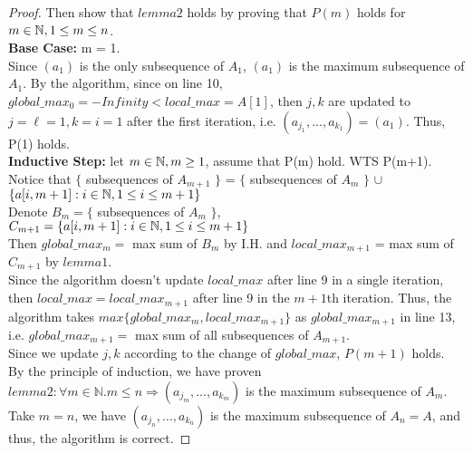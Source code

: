 \documentclass[11pt]{article}
\begin{document}
\begin{enumerate}
\begin{proof}
    Then show that $lemma2$ holds by proving that $P(m)$ holds for $m \in \mathbb N, 1\leq m \leq n$.\\[2ex]
    \textbf{Base Case:} m = 1.\\
    Since $(a_1)$ is the only subsequence of $A_1$, $(a_1)$ is the maximum subsequence of $A_1$. By the algorithm, since on line 10, $global\_max_0 = -Infinity < local\_max = A[1]$, then $j, k$ are updated to $j=\ell = 1, k= i = 1$ after the first iteration, i.e. $(a_{j_1},...,a_{k_1}) = (a_1)$. Thus, P(1) holds.\\[2ex]
    \textbf{Inductive Step: } let $m\in \mathbb N, m \geq 1$, assume that P(m) hold. WTS P(m+1).\\
    Notice that $\{$ subsequences of $A_{m+1}$ $\} $ = $\{$ subsequences of $A_{m}$ $\} $ $\cup$ $\{a[i, m+1]:  i\in\mathbb N, 1\leq i \leq m+1\} $\\
    Denote $B_m = \{$ subsequences of $A_{m}$ $\}$, $C_{m+1} = \{a[i, m+1]:  i\in\mathbb N, 1\leq i \leq m+1\} $\\
    Then $global\_max_m =$ max sum of $B_m$ by I.H. and $local\_max_{m+1}$ = max sum of $C_{m+1}$ by $lemma1$.\\
    Since the algorithm doesn't update $local\_max$ after line 9 in a single iteration, then $local\_max = local\_max_{m+1}$ after line 9 in the $m+1$th iteration. Thus, the algorithm takes $max\{global\_max_{m}, local\_max_{m+1}\}$ as $global\_max_{m+1}$ in line 13, i.e. $global\_max_{m+1} =$ max sum of all subsequences of $A_{m+1}$.\\
    Since we update $j, k$ according to the change of $global\_max$, $P(m+1)$ holds.\\[2ex]
    By the principle of induction, we have proven $lemma2: \forall m\in\mathbb{N}. m\leq n\Rightarrow (a_{j_m},...,a_{k_m})$ is the maximum subsequence of $A_m$.\\
    Take $m = n$, we have $(a_{j_n},...,a_{k_n})$ is the maximum subsequence of $A_n = A$, and thus, the algorithm is correct.
    \end{proof}
\newpage


\end{enumerate}
\end{document}
